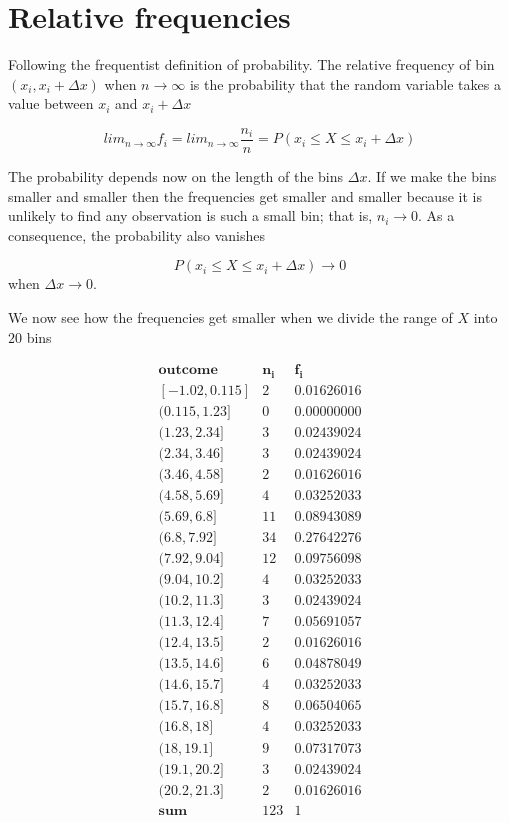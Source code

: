 \documentclass[
]{book}
\begin{document}
\hypertarget{relative-frequencies-2}{%
\section{Relative frequencies}\label{relative-frequencies-2}}

Following the frequentist definition of probability. The relative frequency of bin \((x_i, x_i + \Delta x)\) when \(n \rightarrow \infty\) is the probability that the random variable takes a value between \(x_i\) and \(x_i + \Delta x\)

\[lim_{n\rightarrow\infty}f_i=lim_{n\rightarrow\infty}\frac{n_i}{n} = P(x_i \leq X  \leq x_i + \Delta x)\]

The probability depends now on the length of the bins \(\Delta x\). If we make the bins smaller and smaller then the frequencies get smaller and smaller because it is unlikely to find any observation is such a small bin; that is, \(n_i \rightarrow 0\). As a consequence, the probability also vanishes

\[P(x_i \leq X  \leq x_i + \Delta x) \rightarrow 0\] when \(\Delta x \rightarrow 0\).

We now see how the frequencies get smaller when we divide the range of \(X\) into \(20\) bins

\[
\begin{array}{ccc}
\mathbf{outcome} & \mathbf{n_i} & \mathbf{f_i} \\
\mathrm{[-1.02,0.115]}   &  2 & 0.01626016 \\
\mathrm{(0.115,1.23]}    &  0 & 0.00000000 \\
\mathrm{(1.23,2.34]}     &  3 & 0.02439024 \\
\mathrm{(2.34,3.46]}     &  3 & 0.02439024 \\
\mathrm{(3.46,4.58]}     &  2 & 0.01626016 \\
\mathrm{(4.58,5.69]}     &  4 & 0.03252033 \\
\mathrm{(5.69,6.8]}      & 11 & 0.08943089 \\
\mathrm{(6.8,7.92]}      & 34 & 0.27642276 \\
\mathrm{(7.92,9.04]}     & 12 & 0.09756098 \\
\mathrm{(9.04,10.2]}     &  4 & 0.03252033 \\
\mathrm{(10.2,11.3]}     &  3 & 0.02439024 \\
\mathrm{(11.3,12.4]}     &  7 & 0.05691057 \\
\mathrm{(12.4,13.5]}     &  2 & 0.01626016 \\
\mathrm{(13.5,14.6]}     &  6 & 0.04878049 \\
\mathrm{(14.6,15.7]}     &  4 & 0.03252033 \\
\mathrm{(15.7,16.8]}     &  8 & 0.06504065 \\
\mathrm{(16.8,18]}       &  4 & 0.03252033 \\
\mathrm{(18,19.1]}       &  9 & 0.07317073 \\
\mathrm{(19.1,20.2]}     &  3 & 0.02439024 \\
\mathrm{(20.2,21.3]}     &  2 & 0.01626016 \\ \hline
\mathbf{sum}    & 123 & 1
\end{array}
\]
\end{document}
